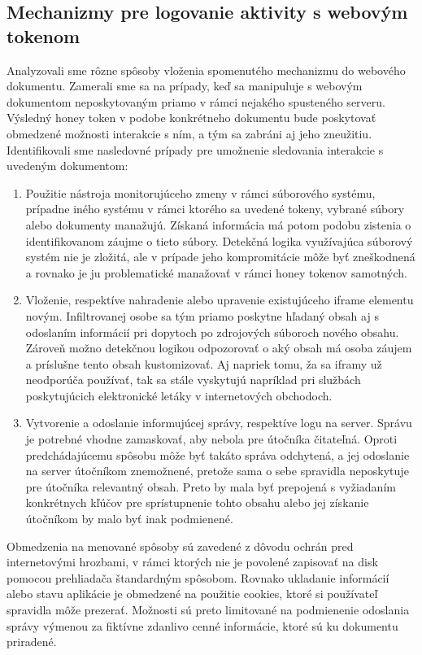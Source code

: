 \documentclass[conference, 11pt,slovak,a4paper,twoside]{IEEEtran}
\begin{document}
\subsection{Mechanizmy pre logovanie aktivity s webovým tokenom} \label{mechanismForLoggingActivity}

Analyzovali sme rôzne spôsoby vloženia spomenutého mechanizmu do webového dokumentu. Zamerali sme sa na prípady, keď sa manipuluje s webovým dokumentom neposkytovaným priamo v rámci nejakého spusteného serveru. Výsledný honey token v podobe konkrétneho dokumentu bude poskytovať obmedzené možnosti interakcie s ním, a tým sa zabráni aj jeho zneužitiu. Identifikovali sme nasledovné prípady pre umožnenie sledovania interakcie s uvedeným dokumentom:

\begin{enumerate}
	\item Použitie nástroja monitorujúceho zmeny v rámci súborového systému, prípadne iného systému v rámci ktorého sa uvedené tokeny, vybrané súbory alebo dokumenty manažujú. Získaná informácia má potom podobu zistenia o identifikovanom záujme o tieto súbory. Detekčná logika využívajúca súborový systém nie je zložitá, ale v prípade jeho kompromitácie môže byť zneškodnená a rovnako je ju problematické manažovať v rámci honey tokenov samotných.
	
	\item Vloženie, respektíve nahradenie alebo upravenie existujúceho iframe elementu novým. Infiltrovanej osobe sa tým priamo poskytne hľadaný obsah aj s odoslaním informácií pri dopytoch po zdrojových súboroch nového obsahu. Zároveň možno detekčnou logikou odpozorovať o aký obsah má osoba záujem a príslušne tento obsah kustomizovať. Aj napriek tomu, ža sa iframy už neodporúča používať, tak sa stále vyskytujú napríklad pri službách poskytujúcich elektronické letáky v internetových obchodoch.

	\item Vytvorenie a odoslanie informujúcej správy, respektíve logu na server. Správu je potrebné vhodne zamaskovať, aby nebola pre útočníka čitateľná. Oproti predchádajúcemu spôsobu môže byť takáto správa odchytená, a jej odoslanie na server útočníkom znemožnené, pretože sama o sebe spravidla neposkytuje pre útočníka relevantný obsah. Preto by mala byť prepojená s vyžiadaním konkrétnych kľúčov pre sprístupnenie tohto obsahu alebo jej získanie útočníkom by malo byť inak podmienené. 
\end{enumerate}
 
Obmedzenia na menované spôsoby sú zavedené z dôvodu ochrán pred internetovými hrozbami, v rámci ktorých nie je povolené zapisovať na disk pomocou prehliadača štandardným spôsobom. Rovnako ukladanie informácií alebo stavu aplikácie je obmedzené na použitie cookies, ktoré si používateľ spravidla môže prezerať. Možnosti sú preto limitované na podmienenie odoslania správy výmenou za fiktívne zdanlivo cenné informácie, ktoré sú ku dokumentu priradené.
  
\end{document}
